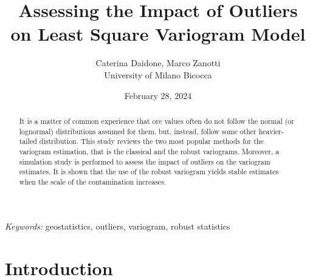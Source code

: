 \documentclass[
  12pt]{article}
\begin{document}
\def\spacingset#1{\renewcommand{\baselinestretch}%
{#1}\small\normalsize} \spacingset{1}



\date{February 28, 2024}
\title{\bf Assessing the Impact of Outliers on Least Square Variogram
Model}
\author{
Caterina Daidone, Marco Zanotti\\
University of Milano Bicocca\\
}
\maketitle

\bigskip
\bigskip
\begin{abstract}
It is a matter of common experience that ore values often do not follow
the normal (or lognormal) distributions assumed for them, but, instead,
follow some other heavier-tailed distribution. This study reviews the
two most popular methods for the variogram estimation, that is the
classical and the robust variograms. Moreover, a simulation study is
performed to assess the impact of outliers on the variogram estimates.
It is shown that the use of the robust variogram yields stable estimates
when the scale of the contamination increases.
\end{abstract}

\noindent%
{\it Keywords:} geostatistics, outliers, variogram, robust statistics
\vfill

\newpage
\spacingset{1.9} %

\section{Introduction}\label{introduction}
\end{document}

